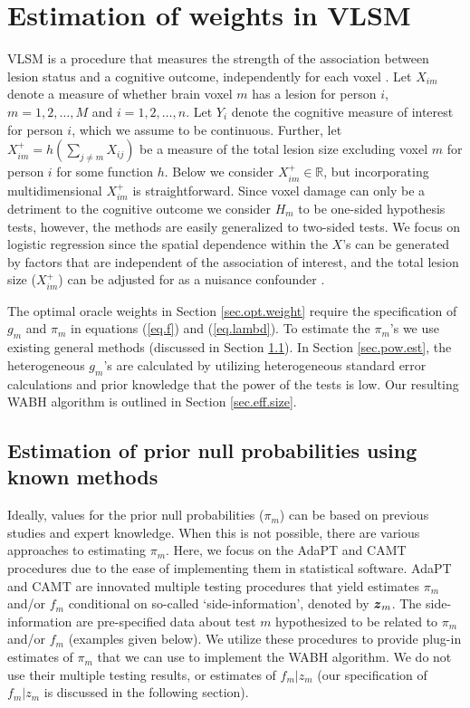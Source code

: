 \documentclass[bimj,fleqn]{w-art}
\newcommand{\mbf}[1]{\mbox{\boldmath${#1}$}}
\theoremstyle{plain}
\theoremstyle{definition}
\begin{document}
\section{Estimation of weights in VLSM}\label{sec.w.VLSM}
VLSM is a procedure that measures the strength of the association between lesion status and a cognitive outcome, independently for each voxel \citep{Batetal03}.  Let $X_{im}$ denote a measure of whether brain voxel $m$ has a lesion for person $i$, $m=1,2,\ldots,M$ and $i=1,2,\ldots,n$. Let $Y_i$ denote the cognitive measure of interest for person $i$, which we assume to be continuous. Further, let $X^+_{im} = h(\sum_{j \neq m} X_{ij})$ be a measure of the total lesion size excluding voxel $m$ for person $i$ for some function $h$.  Below we consider $X^+_{im} \in \mathbb{R}$, but incorporating multidimensional $X^+_{im}$ is straightforward. Since voxel damage can only be a detriment to the cognitive outcome we consider $H_m$ to be one-sided hypothesis tests, however, the methods are easily generalized to two-sided tests.  We focus on logistic regression since the spatial dependence within the $X$'s can be generated by factors that are independent of the association of interest, and the total lesion size ($X^+_{im}$) can be adjusted for as a nuisance confounder \citep{Karetal04,Arnetal18,Roretal07}.

The optimal oracle weights in Section \ref{sec.opt.weight} require the specification of $g_m$ and $\pi_m$ in equations (\ref{eq.f}) and (\ref{eq.lambd}). To estimate the $\pi_m$'s we use existing general methods (discussed in Section \ref{sec.prior.prob}). In Section \ref{sec.pow.est}, the heterogeneous $g_m$'s are calculated by utilizing heterogeneous standard error calculations and prior knowledge that the power of the tests is low. Our resulting WABH algorithm is outlined in Section \ref{sec.eff.size}. 



\subsection{Estimation of prior null probabilities using known methods}\label{sec.prior.prob}

Ideally, values for the prior null probabilities ($\pi_m$) can be based on previous studies and expert knowledge.  When this is not possible, there are various approaches to estimating $\pi_m$. Here, we focus on the AdaPT and CAMT procedures \citep{Lihua2018,Xianyang20} due to the ease of implementing them in statistical software. AdaPT and CAMT are innovated multiple testing procedures that yield estimates $\pi_m$ and/or $f_m$ conditional on so-called `side-information', denoted by $\mbf{z}_m$. The side-information are pre-specified data about test $m$ hypothesized to be related to $\pi_m$ and/or $f_m$ (examples given below). We utilize these procedures to provide plug-in estimates of $\pi_m$ that we can use to implement the WABH algorithm. We do not use their multiple testing results, or estimates of $f_m|z_m$ (our specification of $f_m|z_m$ is discussed in the following section).
\end{document}
